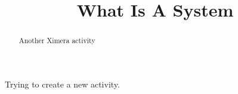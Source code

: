 \documentclass{ximera}
\title{What Is A System}
\begin{document}
\begin{abstract}
Another Ximera activity
\end{abstract}
\maketitle

Trying to create a new activity.
\end{document}
